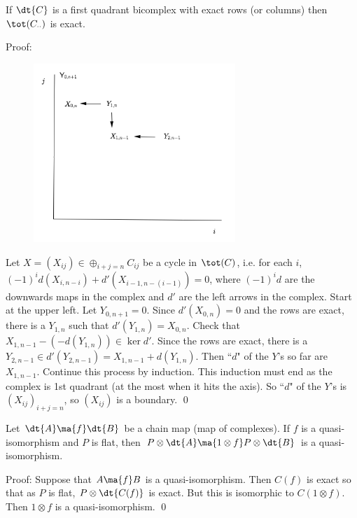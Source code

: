 \begin{lem} \label{lemtwo}
If $\dt{C}$ is a first quadrant bicomplex with exact rows (or columns) then $\tot(C_{\cdot \cdot})$ is exact. 
\end{lem}

\noindent Proof:
\begin{figure}[h] 
   \centering
   \includegraphics[width=3in]{images/arrows.png} 
\end{figure}
Let $X=(X_{ij}) \in \oplus_{i+j=n} C_{ij}$ be a cycle in $\tot(C)$, i.e. for each $i$, $(-1)^id(X_{i,n-i})+d'(X_{i-1,n-(i-1)})=0$, where $(-1)^id$ are the downwards maps in the complex and $d'$ are the left arrows in the complex. Start at the upper left. Let $Y_{0,n+1}=0$. Since $d'(X_{0,n})=0$ and the rows are exact, there is a $Y_{1,n}$ such that $d'(Y_{1,n})=X_{0,n}$. Check that $X_{1,n-1}-(-d(Y_{1,n})) \in \ker d'$. Since the rows are exact, there is a $Y_{2,n-1} \in d'(Y_{2,n-1})=X_{1,n-1}+d(Y_{1,n})$. Then ``$d$" of the $Y$'s so far are $X_{1,n-1}$. Continue this process by induction. This induction must end as the complex is 1st quadrant (at the most when it hits the axis). So ``$d$" of the $Y$'s is $(X_{ij})_{i+j=n}$, so $(X_{ij})$ is a boundary. \qed \\

\begin{lem} \label{lemthree}
Let $\dt{A} \ma{f} \dt{B}$ be a chain map (map of complexes). If $f$ is a quasi-isomorphism and $P$ is flat, then $P \otimes \dt{A} \ma{1 \otimes f} P \otimes \dt{B}$ is a quasi-isomorphism. 
\end{lem}

\noindent Proof: Suppose that $A \ma{f} B$ is a quasi-isomorphism. Then $C(f)$ is exact so that as $P$ is flat, $P \otimes \dt{C(f)}$ is exact. But this is isomorphic to $C(1 \otimes f)$. Then $1 \otimes f$ is a quasi-isomorphism. \qed \\

